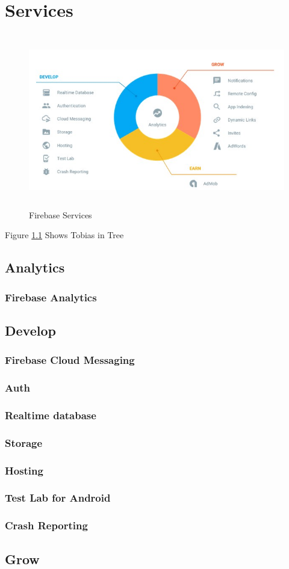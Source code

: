 \chapter{Services}
\begin{figure}[H]
	\centering
	\includegraphics[height=3in]{./TeX_files/Pic1}
	\caption[optional caption]{Firebase Services}
	\label{Fig:Tobias}
\end{figure}
Figure \ref{Fig:Tobias} Shows Tobias in Tree

\section{Analytics}
\subsection{Firebase Analytics}
\section{Develop}
\subsection{Firebase Cloud Messaging}
\subitem{
	
	}
\subsection{Auth}
\subsection{Realtime database}
\subsection{Storage}
\subsection{Hosting}
\subsection{Test Lab for Android}
\subsection{Crash Reporting}

\section{Grow}